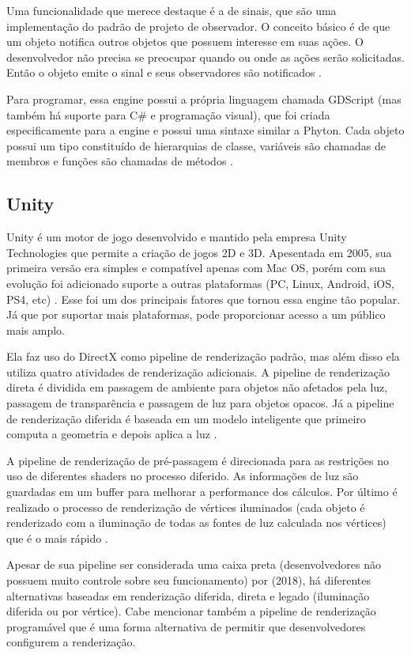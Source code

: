 Uma funcionalidade que merece destaque é a de sinais, que são uma implementação do padrão de projeto de observador. O conceito básico é de que um objeto notifica outros objetos que possuem interesse em suas ações. O desenvolvedor não precisa se preocupar quando ou onde as ações serão solicitadas. Então o objeto emite o sinal e seus observadores são notificados \cite{godotEngine}.

Para programar, essa engine possui a própria linguagem chamada GDScript (mas também há suporte para C\# e programação visual), que foi criada especificamente para a engine e possui uma sintaxe similar a Phyton. Cada objeto possui um tipo constituído de hierarquias de classe, variáveis são chamadas de membros e funções são chamadas de métodos \cite{godotEngine}.

\subsection{Unity}
\label{sec:unity}

Unity é um motor de jogo desenvolvido e mantido pela empresa Unity Technologies que permite a criação de jogos 2D e 3D. Apesentada em 2005, sua primeira versão era simples e compatível apenas com Mac OS, porém com sua evolução foi adicionado suporte a outras plataformas (PC, Linux, Android, iOS, PS4, etc) \cite{compStudyGE}. Esse foi um dos principais fatores que tornou essa engine tão popular. Já que por suportar mais plataformas, pode proporcionar acesso a um público mais amplo.

Ela faz uso do DirectX como pipeline de renderização padrão, mas além disso ela utiliza quatro atividades de renderização adicionais. A pipeline de renderização direta é dividida em passagem de ambiente para objetos não afetados pela luz, passagem de transparência e passagem de luz para objetos opacos. Já a pipeline de renderização diferida é baseada em um modelo inteligente que primeiro computa a geometria e depois aplica a luz \cite{simon2015unity}.

A pipeline de renderização de pré-passagem é direcionada para as restrições no uso de diferentes shaders no processo diferido. As informações de luz são guardadas em um buffer para melhorar a performance dos cálculos. Por último é realizado o processo de renderização de vértices iluminados (cada objeto é renderizado com a iluminação de todas as fontes de luz calculada nos vértices) que é o mais rápido \cite{simon2015unity}. 

Apesar de sua pipeline ser considerada uma caixa preta (desenvolvedores não possuem muito controle sobre seu funcionamento) por  (2018), há diferentes alternativas baseadas em renderização diferida, direta e legado (iluminação diferida ou por vértice). Cabe mencionar também a pipeline de renderização programável que é uma forma alternativa de permitir que desenvolvedores configurem a renderização.

